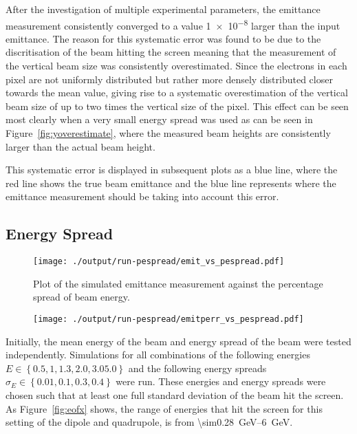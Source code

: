 After the investigation of multiple experimental parameters, the emittance
measurement consistently converged to a value \num{1e-8} larger than the input
emittance. The reason for this systematic error was found to be due to the
discritisation of the beam hitting the screen meaning that the measurement of
the vertical beam size was consistently overestimated. Since the electrons in
each pixel are not uniformly distributed but rather more densely distributed
closer towards the mean value, giving rise to a systematic overestimation of the
vertical beam size of up to two times the vertical size of the pixel. This
effect can be seen most clearly when a very small energy spread was used as can
be seen in Figure~\ref{fig:yoverestimate}, where the measured beam heights are
consistently larger than the actual beam height.

This systematic error is displayed in subsequent plots as a blue line, where the
red line shows the true beam emittance and the blue line represents where the
emittance measurement should be taking into account this error.

\subsection{Energy Spread}

\begin{figure}[!tb]
	\centering
	\texttt{[image: ./output/run-pespread/emit\_vs\_pespread.pdf]}
	\caption{
		Plot of the simulated emittance measurement against the percentage
		spread of beam energy.
	}
	\label{fig:emit_pespread}
\end{figure}

\begin{figure}[!tb]
	\centering
	\texttt{[image: ./output/run-pespread/emitperr\_vs\_pespread.pdf]}
	\caption{
	}
	\label{fig:emitperr_pespread}
\end{figure}


Initially, the mean energy of the beam and energy spread of the beam were tested
independently. Simulations for all combinations of the following energies \(E
\in \left\{ 0.5, 1, 1.3, 2.0, 3.0 5.0\right\} \) and the following energy
spreads \(\sigma_E \in \left\{ 0.01, 0.1, 0.3, 0.4 \right\}\) were run.  These
energies and energy spreads were chosen such that at least one full standard
deviation of the beam hit the screen. As Figure~\ref{fig:eofx} shows, the range
of energies that hit the screen for this setting of the dipole and quadrupole,
is from \SIrange{\sim0.28}{6}{\giga\electronvolt}.


